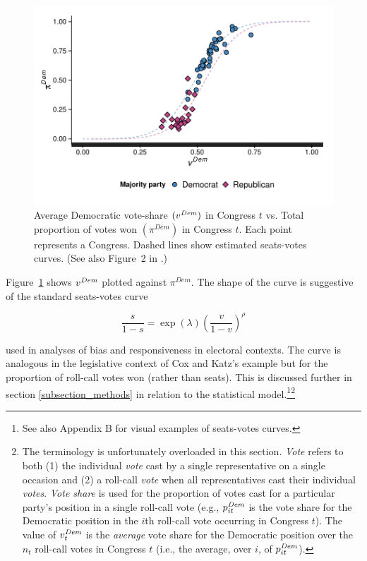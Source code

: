 \begin{figure}
\centering
	\includegraphics[scale=0.75]{sections/figs/vdem_vs_pdem2}
\caption{Average Democratic vote-share $(v^{\it Dem})$ in Congress $t$ vs. Total proportion of 
votes won $(\pi^{Dem})$ in Congress $t$. Each point represents a Congress. Dashed lines show 
estimated seats-votes curves. (See also Figure~2 in \protect{}.)}
\label{fig:log_vratio_vs_ptdem}
\end{figure}


Figure~\ref{fig:log_vratio_vs_ptdem} shows $v^{\it Dem}$ plotted against $\pi^{Dem}$. 
The shape of the curve is suggestive of the standard seats-votes curve  

\begin{equation*}
 \frac{s}{1-s} = \exp{(\lambda)}\left(\frac{v}{1-v}\right)^\rho 
\end{equation*}

\noindent used in analyses of bias and responsiveness in electoral contexts. The curve is 
analogous in the legislative context of Cox and Katz's example but for the proportion of 
roll-call votes won (rather than seats). This is discussed further in section \ref{subsection_methods}
in relation to the statistical model.\footnote{See also Appendix B %
for visual examples of seats-votes curves.}\footnote{The terminology is unfortunately overloaded in this 
section. {\it Vote} refers to both (1) the individual {\it vote} cast by a single representative on a 
single occasion and (2) a roll-call {\it vote} when all representatives cast their individual {\it votes}. 
{\it Vote share} is used for the proportion of votes cast for a particular party's position in a single 
roll-call vote (e.g., $p^{\it Dem}_{it}$ is the vote share for the Democratic position in the $i$th 
roll-call vote occurring in Congress $t$). The value of $v_t^{\it Dem}$ is the {\it average} vote 
share for the Democratic position over the $n_t$ roll-call votes in Congress $t$ (i.e., the average, 
over $i$, of $p^{\it Dem}_{it}$). }  

